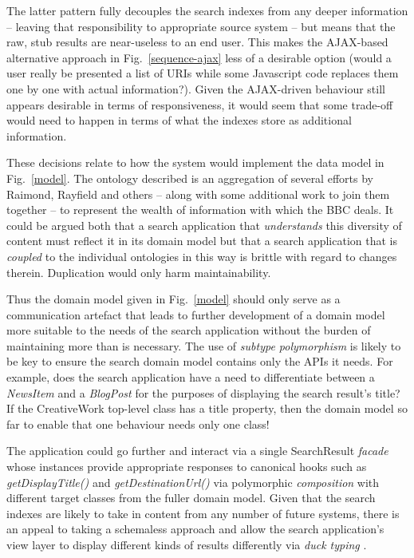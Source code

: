 \documentclass{llncs}
\begin{document}
The latter pattern fully decouples the search indexes from any
deeper information -- leaving that responsibility to appropriate
source system -- but means that the raw, stub results are near-useless
to an end user. This makes the AJAX-based alternative approach
in Fig.~\ref{sequence-ajax}
less of a desirable option (would a user really be presented a list
of URIs while some Javascript code replaces them one by one with
actual information?). Given the AJAX-driven behaviour still appears
desirable in terms of responsiveness, it would seem that some trade-off
would need to happen in terms of what the indexes store as additional
information.

These decisions relate to how the system would implement the data model
in Fig.~\ref{model}. The ontology described is an aggregation
of several efforts by Raimond\cite{raimond2009bbc}, Rayfield
\cite{rayfield2011bbc} and others -- along with some additional work
to join them together -- to represent the wealth of
information with which the BBC deals. It could be argued both that
a search application that \emph{understands} this diversity of
content must reflect it in its domain model but that a search
application that is \emph{coupled} to the individual ontologies
in this way is brittle with regard to changes therein. Duplication
would only harm maintainability.

Thus the domain model given in Fig.~\ref{model} should only serve
as a communication artefact that leads to further development of
a domain model more suitable to the needs of the search application
without the burden of maintaining more than is necessary. The use
of \emph{subtype polymorphism}\cite{booch2007object} is likely
to be key to ensure the search domain model contains only the APIs
it needs. For example, does the search application have a need
to differentiate between a \emph{NewsItem} and a \emph{BlogPost}
for the purposes of displaying the search result's title? If the
CreativeWork top-level class has a title property, then the domain
model so far to enable that one behaviour needs only one class!

The application could go further and interact via a single
SearchResult \emph{facade}\cite{fowler2002patterns} whose
instances provide appropriate responses to canonical hooks
such as \emph{getDisplayTitle()} and \emph{getDestinationUrl()}
via polymorphic \emph{composition} with different target classes
from the fuller domain model. Given that the search indexes
are likely to take in content from any number of future systems,
there is an appeal to taking a schemaless approach\cite{sadalage2012nosql}
and allow the search application's view layer to display
different kinds of results differently via \emph{duck typing}
\cite{python2013ducktyping}.
\end{document}
